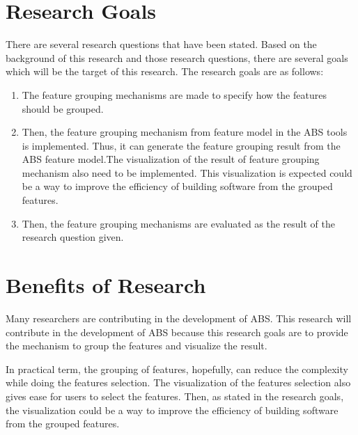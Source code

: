 \section{Research Goals}
There are several research questions that have been stated. Based on the background of this research and those research questions, there are several goals which will be the target of this research. The research goals are as follows: 
\begin{enumerate}
	\item The feature grouping mechanisms are made to specify how the features should be grouped. 
	
	\item Then, the feature grouping mechanism from feature model in the ABS tools is implemented. Thus, it can generate the feature grouping result from the ABS feature model.The visualization of the result of feature grouping mechanism also need to be implemented. This visualization is expected could be a way to improve the efficiency of building software from the grouped features.
	
	\item Then, the feature grouping mechanisms are evaluated as the result of the research question given.
\end{enumerate}

\section{Benefits of Research}
Many researchers are contributing in the development of ABS. This research will contribute in the development of ABS because this research goals are to provide the mechanism to group the features and visualize the result.

In practical term, the grouping of features, hopefully, can reduce the complexity while doing the features selection. The visualization of the features selection also gives ease for users to select the features. Then, as stated in the research goals, the visualization could be a way to improve the efficiency of building software from the grouped features.

